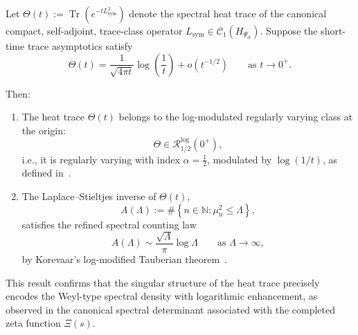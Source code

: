 \begin{lemma}
\label{lem:laplace-kernel-growth-class}
Let \( \Theta(t) := \operatorname{Tr}(e^{-t L_{\mathrm{sym}}^2}) \) denote the spectral heat trace of the canonical compact, self-adjoint, trace-class operator \( L_{\mathrm{sym}} \in \mathcal{C}_1(H_{\Psi_\alpha}) \). Suppose the short-time trace asymptotics satisfy
\[
\Theta(t) = \frac{1}{\sqrt{4\pi t}} \log\left( \frac{1}{t} \right) + o(t^{-1/2}) \qquad \text{as } t \to 0^+.
\]

Then:
\begin{enumerate}
  \item The heat trace \( \Theta(t) \) belongs to the log-modulated regularly varying class at the origin:
  \[
  \Theta \in \mathcal{R}_{1/2}^{\log}(0^+),
  \]
  i.e., it is regularly varying with index \( \alpha = \tfrac{1}{2} \), modulated by \( \log(1/t) \), as defined in~\cite[Ch.~III, §5]{Korevaar2004Tauberian}.

  \item The Laplace–Stieltjes inverse of \( \Theta(t) \),
  \[
  A(\Lambda) := \#\left\{ n \in \mathbb{N} : \mu_n^2 \le \Lambda \right\},
  \]
  satisfies the refined spectral counting law
  \[
  A(\Lambda) \sim \frac{\sqrt{\Lambda}}{\pi} \log \Lambda \qquad \text{as } \Lambda \to \infty,
  \]
  by Korevaar’s log-modified Tauberian theorem~\cite[Thm.~5.5]{Korevaar2004Tauberian}.
\end{enumerate}

\noindent
This result confirms that the singular structure of the heat trace precisely encodes the Weyl-type spectral density with logarithmic enhancement, as observed in the canonical spectral determinant associated with the completed zeta function \( \Xi(s) \).
\end{lemma}

